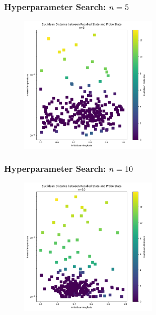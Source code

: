 \begin{frame}
    \frametitle{Hyperparameter Search: \(n=5\)}

    \begin{figure}
        \includegraphics[width=0.6\textwidth]{images/initialHyperparameterSearches/5.png}
    \end{figure}
\end{frame}

\begin{frame}
    \frametitle{Hyperparameter Search: \(n=10\)}

    \begin{figure}
        \includegraphics[width=0.6\textwidth]{images/initialHyperparameterSearches/10.png}
    \end{figure}
\end{frame}

